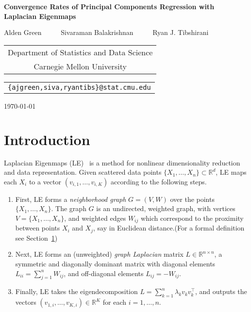 \documentclass{article}
\theoremstyle{definition}
\def\R{\mathbb{R}}
\newcommand{\Reals}{\mathbb{R}} %
\newcommand{\1}{\mathbf{1}}
\begin{document}
	\begin{center} {\Large{\bf{Convergence Rates of Principal Components Regression with Laplacian Eigenmaps}}}
		
		\vspace*{.3cm}
		
		{\large{
				\begin{center}
					Alden Green~~~~~ Sivaraman Balakrishnan~~~~~ Ryan J. Tibshirani\\
					\vspace{.2cm}
				\end{center}
				
				
				\begin{tabular}{c}
					Department of Statistics and Data Science \\
					Carnegie Mellon University
				\end{tabular}
				
				\vspace*{.2in}
				
				\begin{tabular}{c}
					\texttt{\{ajgreen,siva,ryantibs\}@stat.cmu.edu}
				\end{tabular}
		}}
		
		\vspace*{.2in}
		
		\today
		\vspace*{.2in}
	\end{center}

	\section{Introduction}

	Laplacian Eigenmaps (LE)~\citep{belkin03a} is a method for nonlinear dimensionality reduction and data representation. Given scattered data points $\{X_1,\ldots,X_n\} \subset \Reals^d$, LE maps each $X_i$ to a vector $(v_{i,1},\ldots,v_{i,K})$ according to the following steps.
	\begin{enumerate}
		\item First, LE forms a \emph{neighborhood graph} $G = (V,W)$ over the points $\{X_1,\ldots,X_n\}$. The graph $G$ is an undirected, weighted graph, with vertices $V = \{X_1,\ldots,X_n\}$, and weighted edges $W_{ij}$ which correspond to the proximity between points $X_i$ and $X_j$, say in Euclidean distance.(For a formal definition see Section~\ref{})
		\item Next, LE forms an (unweighted) \emph{graph Laplacian} matrix $L \in \Reals^{n \times n}$, a symmetric and diagonally dominant matrix with diagonal elements $L_{ii} = \sum_{j = 1}^{n} W_{ij}$, and off-diagonal elements $L_{ij} = -W_{ij}$. 
		\item Finally, LE takes the eigendecomposition $L = \sum_{k = 1}^{n} \lambda_k v_k v_k^{\top}$, and outputs the vectors $(v_{1,i},\ldots,v_{K,i}) \in \Reals^K$ for each $i = 1,\ldots,n$.
	\end{enumerate} 
	
\end{document}

